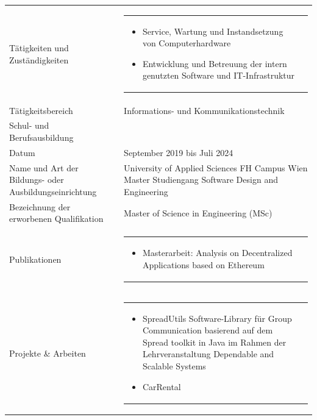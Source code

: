 \begin{longtable}{p{}|p{}}
	Tätigkeiten und Zuständigkeiten &
	\begin{tabular} {m{} m{} }
	\begin{itemize}[nosep,leftmargin=1em]
	\item Service, Wartung und Instandsetzung von Computerhardware
	\item Entwicklung und Betreuung der intern genutzten Software und IT-Infrastruktur
	\end{itemize}
	\end{tabular}
	\\
	Tätigkeitsbereich & Informations- und Kommunikationstechnik \\ \bottomrule
	\large{Schul- und Berufsausbildung} & \\
	Datum & September 2019 bis Juli 2024 \\
	Name und Art der Bildungs- oder Ausbildungseinrichtung & University of Applied Sciences FH Campus Wien \newline
	Master Studiengang Software Design and Engineering \\
	Bezeichnung der erworbenen Qualifikation & Master of Science in Engineering (MSc) \\
	Publikationen &
	\begin{tabular} {m{} m{} }
	\begin{itemize}[nosep,leftmargin=1em]
	\item Masterarbeit: Analysis on Decentralized Applications based on Ethereum
	\end{itemize}
	\end{tabular}
	\\
	Projekte \& Arbeiten & %
	\begin{tabular}{m{} m{} }
	\begin{itemize}[nosep,leftmargin=1em]
	\item SpreadUtils \newline
	Software-Library für Group Communication basierend auf dem Spread toolkit in Java im Rahmen der Lehrveranstaltung \dq Dependable and Scalable Systems\dq
	\item CarRental \newline

\end{itemize}
\end{tabular}
\end{longtable}
